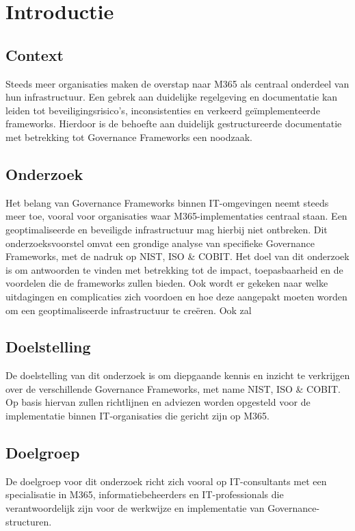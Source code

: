 
\section{Introductie}%
\label{sec:introductie}

\subsection{Context}
Steeds meer organisaties maken de overstap naar M365 als centraal onderdeel van hun infrastructuur. Een gebrek aan duidelijke regelgeving en documentatie kan leiden tot beveiligingsrisico's, inconsistenties en verkeerd geïmplementeerde frameworks. Hierdoor is de behoefte aan duidelijk gestructureerde documentatie met betrekking tot Governance Frameworks een noodzaak.

\subsection{Onderzoek}
Het belang van Governance Frameworks binnen IT-omgevingen neemt steeds meer toe, vooral voor organisaties waar M365-implementaties centraal staan. Een geoptimaliseerde en beveiligde infrastructuur mag hierbij niet ontbreken. Dit onderzoeksvoorstel omvat een grondige analyse van specifieke Governance Frameworks, met de nadruk op NIST, ISO \& COBIT. 
Het doel van dit onderzoek is om antwoorden te vinden met betrekking tot de impact, toepasbaarheid en de voordelen die de frameworks zullen bieden. Ook wordt er gekeken naar welke uitdagingen en complicaties zich voordoen en hoe deze aangepakt moeten worden om een geoptimaliseerde infrastructuur te creëren. Ook zal

\subsection{Doelstelling}
De doelstelling van dit onderzoek is om diepgaande kennis en inzicht te verkrijgen over de verschillende Governance Frameworks, met name NIST, ISO \& COBIT. Op basis hiervan zullen richtlijnen en adviezen worden opgesteld voor de implementatie binnen IT-organisaties die gericht zijn op M365.

\subsection{Doelgroep}
De doelgroep voor dit onderzoek richt zich vooral op IT-consultants met een specialisatie in M365, informatiebeheerders en IT-professionals die verantwoordelijk zijn voor de werkwijze en implementatie van Governance-structuren. 

